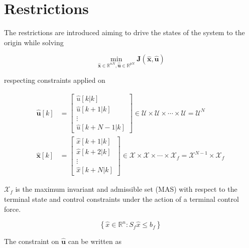 
\section{Restrictions}

The restrictions are introduced aiming to drive the states of the system to the origin while solving

\noindent
\begin{equation}
	\min_{\mathbf{\hat{x}} \in \mathbb{R}^{nN}, \mathbf{\hat{u}} \in \mathbb{R}^{pN}}{\mathbf{J(\hat{x},\hat{u})}}
\end{equation}

\noindent
respecting constraints applied on

\noindent
\begin{align}
	\mathbf{\hat{u}}[k]&= \left[
		\begin{matrix}
			\hat{u}[k | k] \\
			\hat{u}[k + 1 | k] \\
			\vdots \\
			\hat{u}[k + N-1 | k]
		\end{matrix}
	\right]
	\in \mathcal{U} \times  \mathcal{U} \times \cdots \times \mathcal{U} = \mathcal{U}^N \\
		\mathbf{\hat{x}}[k] &= \left[
		\begin{matrix}
			\hat{x}[k + 1 | k] \\
			\hat{x}[k + 2 | k] \\
			\vdots \\
			\hat{x}[k + N | k]
		\end{matrix}
	\right]
	\in \mathcal{X} \times  \mathcal{X} \times \cdots \times \mathcal{X}_f = \mathcal{X}^{N-1} \times \mathcal{X}_f
\end{align}

$\mathcal{X}_f$ is the maximum invariant and admissible set (MAS) with respect to the terminal state and control
constraints under the action of a terminal control force.

\noindent
\begin{equation}
	\left\{
		\hat{x} \in \mathbb{R}^n : S_f \hat{x} \leq b_f
	\right\}
\end{equation}

\noindent
The constraint on $\mathbf{\hat{u}}$ can be  written as

